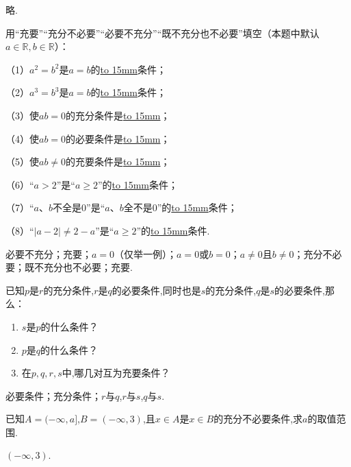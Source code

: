 \documentclass[lang=cn,newtx,10pt,scheme=chinese]{elegantbook}
\begin{document}
\begin{solution}
  略.
\end{solution}
\begin{exercise}\label{BJ4Z_Algebra1_P28.2}
  用“充要”“充分不必要”“必要不充分”“既不充分也不必要”填空（本题中默认$a\in\mathbb{R},b\in\mathbb{R}$）：

  （1）$a^2=b^2$是$a=b$的\underline{\hbox to 15mm{}}条件；

  （2）$a^3=b^3$是$a=b$的\underline{\hbox to 15mm{}}条件；

  （3）使$ab=0$的充分条件是\underline{\hbox to 15mm{}}；

  （4）使$ab=0$的必要条件是\underline{\hbox to 15mm{}}；

  （5）使$ab\neq 0$的充要条件是\underline{\hbox to 15mm{}}；

  （6）“$a>2$”是“$a\geqslant2$”的\underline{\hbox to 15mm{}}条件；

  （7）“$a、b$不全是0”是“$a、b$全不是0”的\underline{\hbox to 15mm{}}条件；

  （8）“$\vert a-2\vert\neq2-a$”是“$a\geqslant2$”的\underline{\hbox to 15mm{}}条件.
\end{exercise}
\begin{solution}
  必要不充分；充要；$a=0$（仅举一例）；$a=0$或$b=0$；$a\neq 0$且$b\neq 0$；充分不必要；既不充分也不必要；充要.
\end{solution}

\begin{exercise}\label{2017_XJ_bx1_P23.8}
  已知$p$是$r$的充分条件,$r$是$q$的必要条件,同时也是$s$的充分条件,$q$是$s$的必要条件,那么：
\end{exercise}

\begin{enumerate}
  \item $s$是$p$的什么条件？
  \item $p$是$q$的什么条件？
  \item 在$p,q,r,s$中,哪几对互为充要条件？
\end{enumerate}

\begin{solution}
  必要条件；充分条件；$r$与$q$,$r$与$s$,$q$与$s$.
\end{solution}

\begin{exercise}\label{2017_RJB_bx1_P36.B5}
  已知$A=(-\infty,a]$,$B=(-\infty,3)$,且$x\in A$是$x\in B$的充分不必要条件,求$a$的取值范围.
\end{exercise}

\begin{solution}
  $(-\infty,3)$.
\end{solution}
\end{document}
